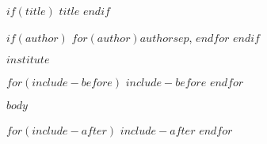 \documentclass[pagesize,english,12pt,a4paper
$if(classoptions)$
    ,$classoptions$
$endif$
]{article}
\begin{document}
\begin{center}
    $if(title)$
    {\textbf{\LARGE{$title$}}}
    $endif$

    \bigskip

    $if(author)$
    $for(author)$$author$$sep$, $endfor$
    $endif$

    {\small{$institute$}}
\end{center}

$for(include-before)$
$include-before$
$endfor$

$body$

$for(include-after)$
$include-after$
$endfor$
\end{document}
